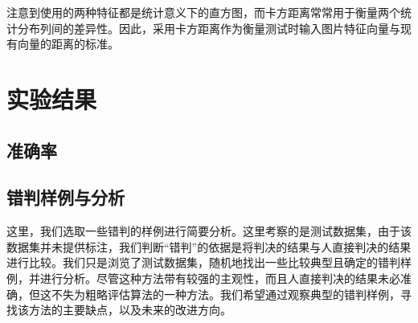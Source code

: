 \documentclass[UTF8]{ctexart}
\begin{document}
注意到使用的两种特征都是统计意义下的直方图，而卡方距离常常用于衡量两个统计分布列间的差异性。因此，采用卡方距离作为衡量测试时输入图片特征向量与现有向量的距离的标准。

\section{实验结果}

\subsection{准确率}

%
%

\subsection{错判样例与分析}

这里，我们选取一些错判的样例进行简要分析。这里考察的是测试数据集，由于该数据集并未提供标注，我们判断“错判”的依据是将判决的结果与人直接判决的结果进行比较。我们只是浏览了测试数据集，随机地找出一些比较典型且确定的错判样例，并进行分析。尽管这种方法带有较强的主观性，而且人直接判决的结果未必准确，但这不失为粗略评估算法的一种方法。我们希望通过观察典型的错判样例，寻找该方法的主要缺点，以及未来的改进方向。
\end{document}
